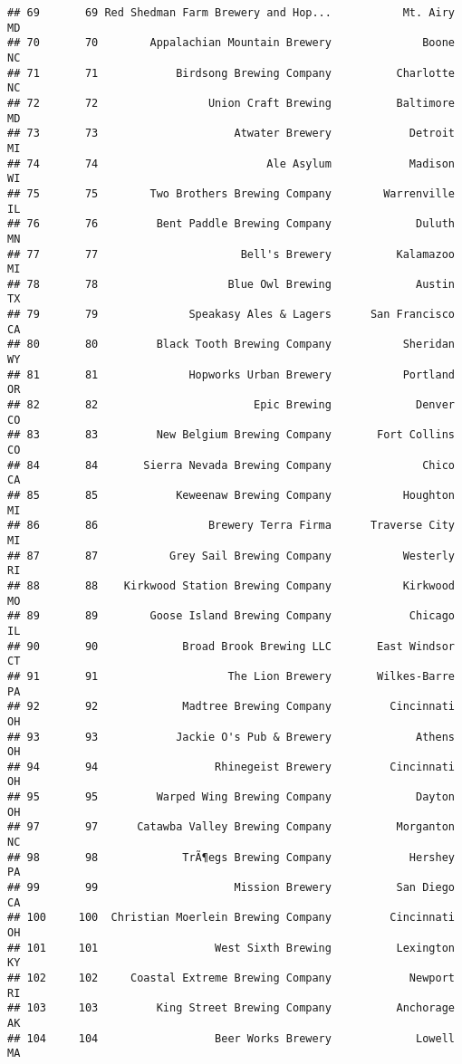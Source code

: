 \documentclass[
]{article}
\begin{document}
\begin{verbatim}
## 69       69 Red Shedman Farm Brewery and Hop...           Mt. Airy    MD
## 70       70        Appalachian Mountain Brewery              Boone    NC
## 71       71            Birdsong Brewing Company          Charlotte    NC
## 72       72                 Union Craft Brewing          Baltimore    MD
## 73       73                     Atwater Brewery            Detroit    MI
## 74       74                          Ale Asylum            Madison    WI
## 75       75        Two Brothers Brewing Company        Warrenville    IL
## 76       76         Bent Paddle Brewing Company             Duluth    MN
## 77       77                      Bell's Brewery          Kalamazoo    MI
## 78       78                    Blue Owl Brewing             Austin    TX
## 79       79              Speakasy Ales & Lagers      San Francisco    CA
## 80       80         Black Tooth Brewing Company           Sheridan    WY
## 81       81              Hopworks Urban Brewery           Portland    OR
## 82       82                        Epic Brewing             Denver    CO
## 83       83         New Belgium Brewing Company       Fort Collins    CO
## 84       84       Sierra Nevada Brewing Company              Chico    CA
## 85       85            Keweenaw Brewing Company           Houghton    MI
## 86       86                 Brewery Terra Firma      Traverse City    MI
## 87       87           Grey Sail Brewing Company           Westerly    RI
## 88       88    Kirkwood Station Brewing Company           Kirkwood    MO
## 89       89        Goose Island Brewing Company            Chicago    IL
## 90       90             Broad Brook Brewing LLC       East Windsor    CT
## 91       91                    The Lion Brewery       Wilkes-Barre    PA
## 92       92             Madtree Brewing Company         Cincinnati    OH
## 93       93            Jackie O's Pub & Brewery             Athens    OH
## 94       94                  Rhinegeist Brewery         Cincinnati    OH
## 95       95         Warped Wing Brewing Company             Dayton    OH
## 97       97      Catawba Valley Brewing Company          Morganton    NC
## 98       98             TrÃ¶egs Brewing Company            Hershey    PA
## 99       99                     Mission Brewery          San Diego    CA
## 100     100  Christian Moerlein Brewing Company         Cincinnati    OH
## 101     101                  West Sixth Brewing          Lexington    KY
## 102     102     Coastal Extreme Brewing Company            Newport    RI
## 103     103         King Street Brewing Company          Anchorage    AK
## 104     104                  Beer Works Brewery             Lowell    MA

\end{verbatim}
\end{document}
